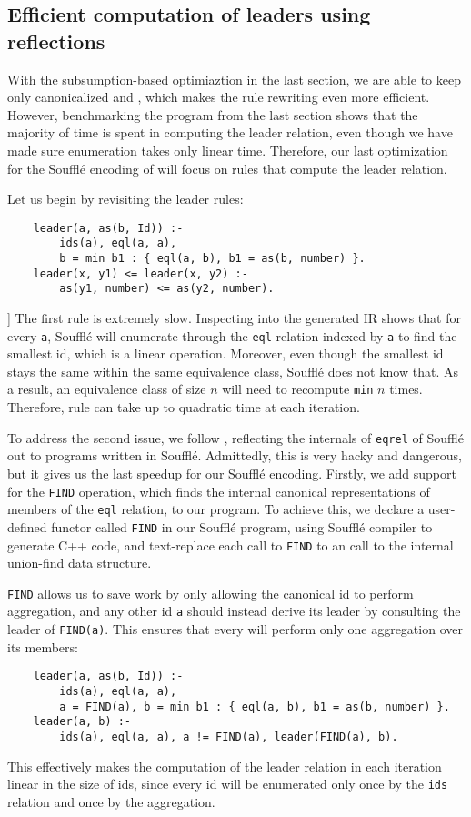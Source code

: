 \subsection{Efficient computation of leaders using reflections}\label{sec:hack}

With the subsumption-based optimiaztion in the last section,
 we are able to keep only canonicalized \enodes and \eclasses,
 which makes the rule rewriting even more efficient.
However, benchmarking the program from the last section
 shows that the majority of time is spent in computing the leader relation,
 even though we have made sure \eclass enumeration takes only linear time.
Therefore, our last optimization for the Souffl\'e encoding of \egraph
 will focus on rules that compute the leader relation.

Let us begin by revisiting the leader rules:
\begin{verbatim}
    leader(a, as(b, Id)) :- 
        ids(a), eql(a, a), 
        b = min b1 : { eql(a, b), b1 = as(b, number) }.
    leader(x, y1) <= leader(x, y2) :-
        as(y1, number) <= as(y2, number).
\end{verbatim}]
The first rule is extremely slow.
Inspecting into the generated IR
 shows that for every \verb|a|, 
 Souffl\'e will enumerate through the \verb|eql| relation indexed by \verb|a|
 to find the smallest id,
 which is a linear operation.
Moreover,
 even though the smallest id stays the same within the same equivalence class,
 Souffl\'e does not know that.
As a result,
 an equivalence class of size $n$ will need to recompute \verb|min| $n$ times.
Therefore, rule can take up to quadratic time at each iteration.

To address the second issue, 
 we follow \citet{zucker-udf-1}, 
 reflecting the internals of \verb|eqrel| of Souffl\'e out
 to programs written in Souffl\'e.
Admittedly, this is very hacky and dangerous,
 but it gives us the last speedup for our Souffl\'e encoding.
Firstly, we add support for the \verb|FIND| operation, 
 which finds the internal canonical representations
 of members of the \verb|eql| relation, to our program.
To achieve this, we declare a user-defined functor called \verb|FIND| 
 in our Souffl\'e program,
 using Souffl\'e compiler to generate C++ code, 
 and text-replace each call to \verb|FIND| to an call 
 to the internal union-find data structure.

\verb|FIND| allows us to save work by
 only allowing the canonical id to perform aggregation,
 and any other id \verb|a| should instead derive its leader by consulting the leader
 of \verb|FIND(a)|.
This ensures that every \eclass will perform only one aggregation over its members:
\begin{verbatim}
    leader(a, as(b, Id)) :- 
        ids(a), eql(a, a), 
        a = FIND(a), b = min b1 : { eql(a, b), b1 = as(b, number) }.
    leader(a, b) :- 
        ids(a), eql(a, a), a != FIND(a), leader(FIND(a), b).
\end{verbatim}
This effectively makes the computation of the leader relation in each iteration
 linear in the size of ids,
 since every id will be enumerated only once by the \verb|ids| relation
 and once by the aggregation.

